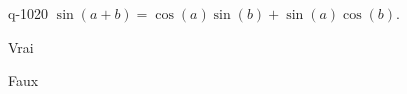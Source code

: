 \begin{truefalse}{q-1020}
$\sin(a+b)=\cos(a)\sin(b)+\sin(a)\cos(b)$.
\item* Vrai
\item Faux
\end{truefalse}

